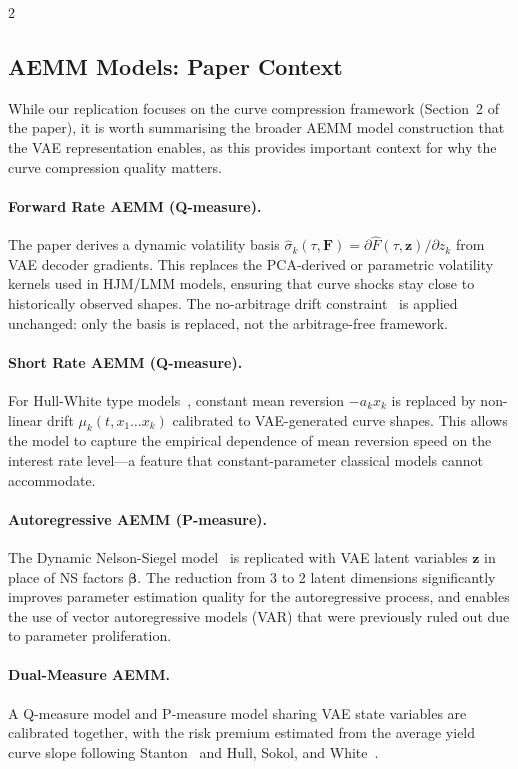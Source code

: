 \documentclass[10pt,a4paper]{article}
\theoremstyle{plain}
\theoremstyle{definition}
\begin{document}
\begin{multicols}{2}
\subsection{AEMM Models: Paper Context}

While our replication focuses on the curve compression framework (Section~2 of the paper), it is worth summarising the broader AEMM model construction that the VAE representation enables, as this provides important context for why the curve compression quality matters.

\paragraph{Forward Rate AEMM (Q-measure).} The paper derives a dynamic volatility basis $\hat{\sigma}_k(\tau, \mathbf{F}) = \partial \hat{F}(\tau, \mathbf{z})/\partial z_k$ from VAE decoder gradients. This replaces the PCA-derived or parametric volatility kernels used in HJM/LMM models, ensuring that curve shocks stay close to historically observed shapes. The no-arbitrage drift constraint~\cite{brigo2006} is applied unchanged: only the basis is replaced, not the arbitrage-free framework.

\paragraph{Short Rate AEMM (Q-measure).} For Hull-White type models~\cite{hull1994}, constant mean reversion $-a_k x_k$ is replaced by non-linear drift $\mu_k(t, x_1 \ldots x_k)$ calibrated to VAE-generated curve shapes. This allows the model to capture the empirical dependence of mean reversion speed on the interest rate level---a feature that constant-parameter classical models cannot accommodate.

\paragraph{Autoregressive AEMM (P-measure).} The Dynamic Nelson-Siegel model~\cite{diebold2006} is replicated with VAE latent variables $\mathbf{z}$ in place of NS factors $\boldsymbol{\beta}$. The reduction from 3 to 2 latent dimensions significantly improves parameter estimation quality for the autoregressive process, and enables the use of vector autoregressive models (VAR) that were previously ruled out due to parameter proliferation.

\paragraph{Dual-Measure AEMM.} A Q-measure model and P-measure model sharing VAE state variables are calibrated together, with the risk premium estimated from the average yield curve slope following Stanton~\cite{stanton1997} and Hull, Sokol, and White~\cite{hsw2014}.


\end{multicols}
\end{document}
